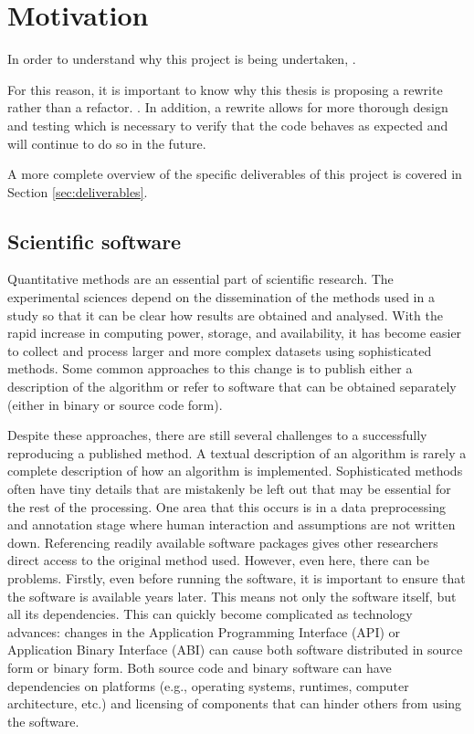 \section{Motivation}


In order to understand why this project is being undertaken, .

For this reason, it is important to know why this thesis is
proposing a rewrite rather than a refactor.
. In addition, a rewrite allows for more thorough
design and testing which is necessary to verify that the code
behaves as expected and will continue to do so in the future.

A more complete overview of the specific deliverables of this project is
covered in Section \ref{sec:deliverables}.

\subsection{Scientific software}
{ %
	Quantitative methods are an essential part of scientific research. The
	experimental sciences depend on the dissemination of the methods used in a
	study so that it can be clear how results are obtained and analysed. With the
	rapid increase in computing power, storage, and availability, it has become
	easier to collect and process larger and more complex datasets using
	sophisticated methods. Some common approaches to this change is to publish either a
	description of the algorithm or refer to software that can be obtained separately
	(either in binary or source code form).
}

Despite these approaches, there are still several challenges to a successfully
reproducing a published method.
{ %
	A textual description of an algorithm is rarely a complete description of
	how an algorithm is implemented. Sophisticated methods often have tiny details
	that are mistakenly be left out that may be essential for the rest of the
	processing. One area that this occurs is in a data preprocessing and annotation
	stage where human interaction and assumptions are not written down.
}
{ %
	Referencing readily available software packages gives
	other researchers direct access to the original method
	used. However, even here, there can be problems. Firstly,
	even before running the software, it is important to
	ensure that the
	software is available years later. This means not only the software itself, but
	all its dependencies. This can quickly become complicated as technology
	advances: changes in the Application Programming Interface (API) or Application
	Binary Interface (ABI) can cause both software distributed in source form or
	binary form. Both source code and binary software can have
	dependencies on platforms (e.g., operating systems,
	runtimes, computer architecture, etc.) and licensing of
	components that can hinder others from using the software.
}

